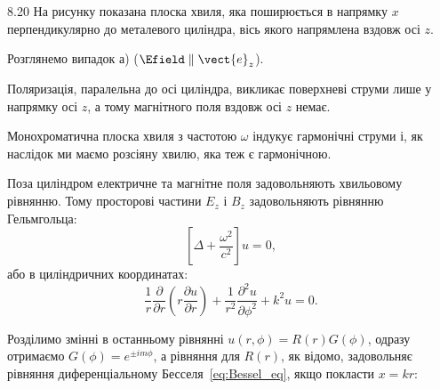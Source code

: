 \begin{Solution}{8.{20}}
	На рисунку показана плоска хвиля, яка поширюється в напрямку $x$ перпендикулярно до металевого циліндра, вісь якого напрямлена вздовж осі $z$.

	\begin{center}
	\end{center}

    Розглянемо випадок а) ($\Efield \parallel \vect{e}_z$).

	Поляризація, паралельна до осі циліндра, викликає поверхневі струми лише у напрямку осі $z$, а тому магнітного поля вздовж осі $z$ немає.
%

	Монохроматична плоска хвиля з частотою $\omega$ індукує  гармонічні струми і, як наслідок ми маємо розсіяну хвилю, яка теж є гармонічною.

	Поза циліндром електричне та магнітне поля задовольняють хвильовому рівнянню.
	Тому просторові частини $E_z$ і $B_z$ задовольняють рівнянню Гельмгольца:
	\[
		\left[ \Delta + \frac{\omega^2}{c^2}\right] u = 0,
	\]
	або в циліндричних координатах:
	\[
		\frac1r \frac{\partial }{\partial r}
		\left( r \frac{\partial u}{\partial r} \right) + \frac{1}{r^2} \frac{\partial^2 u}{\partial \phi^2} + k^2 u = 0.
	\]

	Розділимо змінні в останньому рівнянні $u(r,\phi) = R(r)G(\phi)$, одразу отримаємо $G(\phi) = e^{\pm im\phi}$, а рівняння для $R(r)$, як відомо, задовольняє рівняння диференціальному Бесселя~\eqref{eq:Bessel_eq}, якщо покласти $x = kr$:


\end{Solution}
